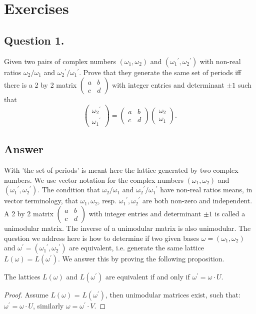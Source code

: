 \section{Exercises}

\subsection*{Question 1.}
\noindent
Given two pairs of complex numbers $(\omega_1, \omega_2)$ and $({\omega_1}^\prime, {\omega_2}^\prime)$ with non-real
ratios $\omega_2 / \omega_1$ and ${\omega_2}^\prime / {\omega_1}^\prime$. Prove that they generate the same set of
periods iff there is a 2 by 2 matrix $\begin{pmatrix} a & b \\ c & d \end{pmatrix}$ with integer entries and
determinant $\pm 1$ such that \[
\begin{pmatrix} {\omega_2}^\prime \\ {\omega_1}^\prime \end{pmatrix} =
\begin{pmatrix} a & b \\ c & d \end{pmatrix} \begin{pmatrix} \omega_2 \\ \omega_1 \end{pmatrix}.
\]

\subsection*{Answer}
\noindent
With 'the set of periods' is meant here the lattice generated by two complex numbers.
We use vector notation for the complex numbers $(\omega_1, \omega_2)$ and $({\omega_1}^\prime, {\omega_2}^\prime)$.
The condition that $\omega_2 / \omega_1$ and ${\omega_2}^\prime / {\omega_1}^\prime$ have non-real ratios means,
in vector terminology, that $\omega_1, \omega_2$, resp. ${\omega_1}^\prime, {\omega_2}^\prime$ are both
non-zero and independent.
A 2 by 2 matrix $\begin{pmatrix} a & b \\ c & d \end{pmatrix}$ with integer entries and determinant $\pm 1$ is called
a unimodular matrix. The inverse of a unimodular matrix is also unimodular.
The question we address here is how to determine if two given bases $\omega = (\omega_1, \omega_2)$ and
$\omega^\prime = ({\omega_1}^\prime, {\omega_2}^\prime)$ are equivalent, i.e. generate the same lattice
$L(\omega)=L(\omega^\prime)$.
We answer this by proving the following proposition.

\begin{proposition}
    The lattices $L(\omega)$ and $L(\omega^\prime)$ are equivalent if and only if $\omega^\prime = \omega \cdot U.$
\end{proposition}

\begin{proof}
    Assume $L(\omega)$ = $L(\omega^\prime)$, then unimodular matrices exist, such that:
    $\omega^\prime = \omega \cdot U$, similarly $\omega = \omega^\prime \cdot V$.
\end{proof}